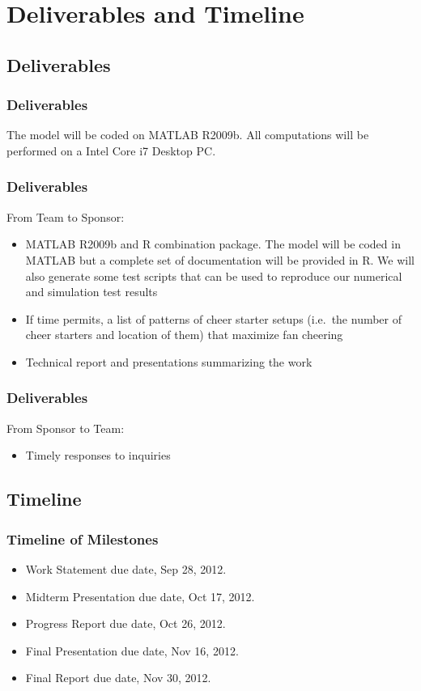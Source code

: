 \documentclass[compress,handout,10pt]{beamer}
\let\olditem\item
\renewcommand{\item}{\setlength{\itemsep}{0.5\baselineskip}\olditem}
\begin{document}
\section {Deliverables and Timeline}

\subsection{Deliverables}

\begin{frame}
	\frametitle{Deliverables}
	The model will be coded on MATLAB R2009b. All computations will be performed on a Intel Core i7 Desktop PC. \newline
	\end{frame}

\begin{frame}
	\frametitle{Deliverables}
	From Team to Sponsor:
	\begin {itemize}
	\item MATLAB R2009b and R combination package. The model will be coded in MATLAB but a complete set of documentation will be provided in R. We will also generate some test scripts that can be used to reproduce our numerical and simulation test results
	\item If time permits, a list of patterns of cheer starter setups (i.e.~the number of cheer starters and location of them) that maximize fan cheering
	\item Technical report and presentations summarizing the work \newline
	\end{itemize}
\end{frame}

\begin{frame}
	\frametitle{Deliverables}
	From Sponsor to Team:
	\begin{itemize}
		\item Timely responses to inquiries
	\end{itemize}
\end{frame}

\subsection{Timeline}

\begin{frame}
	\frametitle{Timeline of Milestones}
	\begin{itemize}
    \item Work Statement due date, Sep 28, 2012.
    \item Midterm Presentation due date, Oct 17, 2012.
    \item Progress Report due date, Oct 26, 2012.
    \item Final Presentation due date, Nov 16, 2012.
    \item Final Report due date, Nov 30, 2012.
	\end{itemize}
\end{frame}
\end{document}
